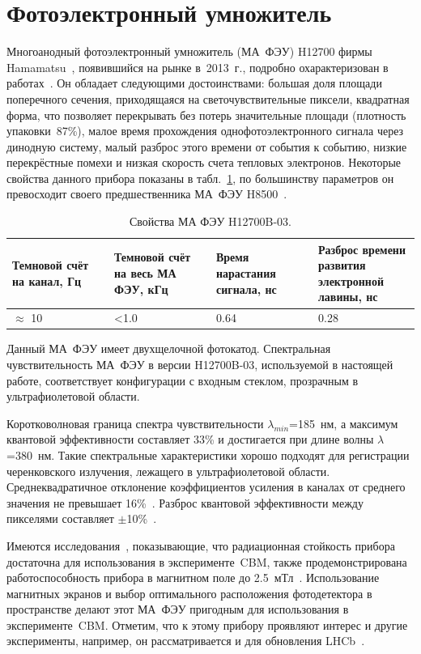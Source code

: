 \section{Фотоэлектронный умножитель}\label{section:secMapmt}

Многоанодный фотоэлектронный умножитель (МА~ФЭУ) H12700 фирмы Hamamatsu~\cite{H12700MANUAL}, появившийся на рынке в~2013~г., подробно охарактеризован в работах~\cite{CALVI, CALVI2}. Он обладает следующими достоинствами: большая доля площади поперечного сечения, приходящаяся на светочувствительные пиксели, квадратная форма, что позволяет перекрывать без потерь значительные площади (плотность упаковки~87\%), малое время прохождения однофотоэлектронного сигнала через динодную систему, малый разброс этого времени от события к событию, низкие перекрёстные помехи и низкая скорость счета тепловых электронов. Некоторые свойства данного прибора показаны в табл.~\ref{tabl:MAPMT}, по большинству параметров он превосходит своего предшественника МА~ФЭУ H8500~\cite{H8500MANUAL}.

\begin{table}[h]
\caption{Свойства МА ФЭУ H12700B-03.}
\label{tabl:MAPMT}
\begin{tabular}{ | p{0.25\linewidth} | p{0.25\linewidth} | p{0.25\linewidth} | p{0.25\linewidth} | }
	\hline
	Темновой счёт на канал, Гц & Темновой счёт на весь МА ФЭУ, кГц & Время нарастания сигнала, нс & Разброс времени развития электронной лавины, нс\\
	\hline
	$ \approx $ 10 & <1.0 & 0.64 & 0.28\\
	\hline
\end{tabular}
\end{table}

Данный МА~ФЭУ имеет двухщелочной фотокатод. Спектральная чувствительность МА~ФЭУ в версии H12700B-03, используемой в настоящей работе, соответствует конфигурации с входным стеклом, прозрачным в ультрафиолетовой области.

Коротковолновая граница спектра чувствительности $ \lambda_{min} $=185~нм, а максимум квантовой эффективности составляет 33\% и достигается при длине волны $ \lambda $=380~нм. Такие спектральные характеристики хорошо подходят для регистрации черенковского излучения, лежащего в ультрафиолетовой области. Среднеквадратичное отклонение коэффициентов усиления в каналах от среднего значения не превышает 16\%~\cite{}. Разброс квантовой эффективности между пикселями составляет $ \pm $10\%~\cite{}.

Имеются исследования~\cite{MAPMTRADHARD, THECBMRICHPROJ16, THECBMRICHDET16}, показывающие, что радиационная стойкость прибора достаточна для использования в эксперименте~CBM, также продемонстрирована работоспособность прибора в магнитном поле до 2.5~мТл~\cite{}. Использование магнитных экранов и выбор оптимального расположения фотодетектора в пространстве делают этот МА~ФЭУ пригодным для использования в эксперименте~CBM. Отметим, что к этому прибору проявляют интерес и другие эксперименты, например, он рассматривается и для обновления LHCb~\cite{}.

